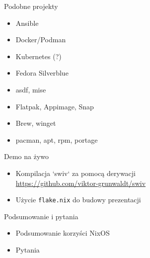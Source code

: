 \documentclass{beamer}
\begin{document}
\begin{frame}{Podobne projekty}
    \begin{itemize}
        \item Ansible
        \item Docker/Podman
        \item Kubernetes (?)
        \item Fedora Silverblue
        \item asdf, mise
        \item Flatpak, Appimage, Snap
        \item Brew, winget
        \item pacman, apt, rpm, portage
    \end{itemize}
\end{frame}

\begin{frame}{Demo na żywo}
    \begin{itemize}
    \item Kompilacja `swiv` za pomocą derywacji\\
        \url{https://github.com/viktor-grunwaldt/swiv}\\
    \item Użycie \texttt{flake.nix} do budowy prezentacji
    \end{itemize}
\end{frame}

\begin{frame}{Podsumowanie i pytania}
    \begin{itemize}
        \item Podsumowanie korzyści NixOS
        \item Pytania
    \end{itemize}
\end{frame}
\end{document}
